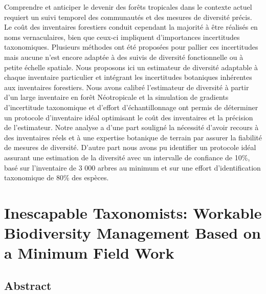 \documentclass[
  11pt,
  french,
  A4paper,
  extrafontsizes,onecolumn,openright
  ]{memoir}
\begin{document}
Comprendre et anticiper le devenir des forêts tropicales dans le
contexte actuel requiert un suivi temporel des communautés et des
mesures de diversité précis. Le coût des inventaires forestiers conduit
cependant la majorité à être réalisés en noms vernaculaires, bien que
ceux-ci impliquent d'importances incertitudes taxonomiques. Plusieurs
méthodes ont été proposées pour pallier ces incertitudes mais aucune
n'est encore adaptée à des suivis de diversité fonctionnelle ou à petite
échelle spatiale. Nous proposons ici un estimateur de diversité
adaptable à chaque inventaire particulier et intégrant les incertitudes
botaniques inhérentes aux inventaires forestiers. Nous avons calibré
l'estimateur de diversité à partir d'un large inventaire en forêt
Néotropicale et la simulation de gradients d'incertitude taxonomique et
d'effort d'échantillonnage ont permis de déterminer un protocole
d'inventaire idéal optimisant le coût des inventaires et la précision de
l'estimateur. Notre analyse a d'une part souligné la nécessité d'avoir
recours à des inventaires réels et à une expertise botanique de terrain
par assurer la fiabilité de mesures de diversité. D'autre part nous
avons pu identifier un protocole idéal assurant une estimation de la
diversité avec un intervalle de confiance de 10\%, basé sur l'inventaire
de 3 000 arbres au minimum et sur une effort d'identification
taxonomique de 80\% des espèces.

\newpage

\section*{Inescapable Taxonomists: Workable Biodiversity Management
Based on a Minimum Field
Work}\label{inescapable-taxonomists-workable-biodiversity-management-based-on-a-minimum-field-work}

\subsection{Abstract}\label{abstract}
\end{document}
